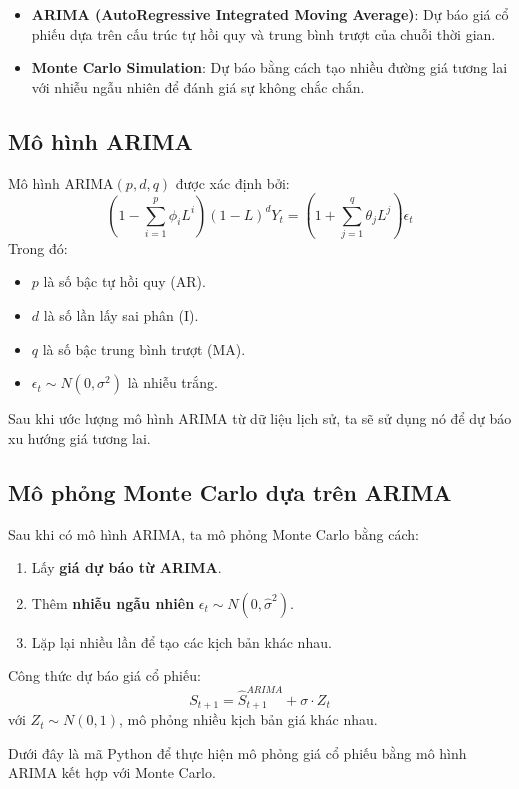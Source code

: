 \begin{itemize}
\item \textbf{ARIMA (AutoRegressive Integrated Moving Average)}: Dự báo giá cổ phiếu dựa trên cấu trúc tự hồi quy và trung bình trượt của chuỗi thời gian.
\item \textbf{Monte Carlo Simulation}: Dự báo bằng cách tạo nhiều đường giá tương lai với nhiễu ngẫu nhiên để đánh giá sự không chắc chắn.
\end{itemize}

\subsection{Mô hình ARIMA}
Mô hình ARIMA$(p, d, q)$ được xác định bởi:
\begin{equation}
(1 - \sum_{i=1}^{p} \phi_i L^i)(1 - L)^d Y_t = (1 + \sum_{j=1}^{q} \theta_j L^j) \epsilon_t
\end{equation}
Trong đó:
\begin{itemize}
\item $p$ là số bậc tự hồi quy (AR).
\item $d$ là số lần lấy sai phân (I).
\item $q$ là số bậc trung bình trượt (MA).
\item $\epsilon_t \sim N(0, \sigma^2)$ là nhiễu trắng.
\end{itemize}
Sau khi ước lượng mô hình ARIMA từ dữ liệu lịch sử, ta sẽ sử dụng nó để dự báo xu hướng giá tương lai.

\subsection{Mô phỏng Monte Carlo dựa trên ARIMA}
Sau khi có mô hình ARIMA, ta mô phỏng Monte Carlo bằng cách:
\begin{enumerate}
\item Lấy \textbf{giá dự báo từ ARIMA}.
\item Thêm \textbf{nhiễu ngẫu nhiên} $\epsilon_t \sim N(0, \hat{\sigma}^2)$.
\item Lặp lại nhiều lần để tạo các kịch bản khác nhau.
\end{enumerate}
Công thức dự báo giá cổ phiếu:
\begin{equation}
S_{t+1} = \hat{S}_{t+1}^{ARIMA} + \sigma \cdot Z_t
\end{equation}
với $Z_t \sim N(0,1)$, mô phỏng nhiều kịch bản giá khác nhau.

Dưới đây là mã Python để thực hiện mô phỏng giá cổ phiếu bằng mô hình ARIMA kết hợp với Monte Carlo.

